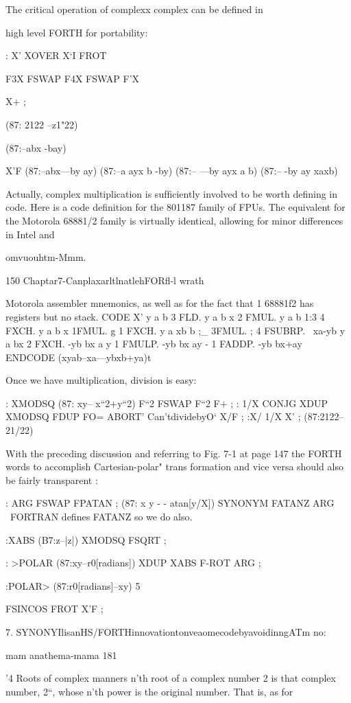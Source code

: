 {The critical operation of complexx complex can be deﬁned in

high level FORTH for portability:

: X'
XOVER X‘I FROT

F3X FSWAP
F4X FSWAP
F'X

X+ ;

(87: 2122 --z1"22)

(87:--abx -bay)

X'F (87:--abx—by ay)
(87:--a ayx b -by)
(87:-- —by ayx a b)
(87:-- -by ay xaxb)

Actually, complex multiplication is sufﬁciently involved to be
worth deﬁning in code. Here is a code deﬁnition for the 801187
family of FPUs. The equivalent for the Motorola 68881/2 family
is virtually identical, allowing for minor differences in Intel and

omvuouhtm-Mmm.

150 Chaptar7-CanplaxarltlnatlehFORﬂ-l wrath

 

Motorola assembler mnemonics, as well as for the fact that 1%
68881f2 has registers but no stack.
\oneration 31mm
CODE X' \x y a b
3 FLD. \x y a b x
2 FMUL. \x y a b 1:3
4 FXCH. \xa y a b x
1FMUL. \xayabxb g
1 FXCH. \xa y a xb b ;_
3FMUL. \xayabxyb ;
4 FSUBRP. \ xa-yb y a bx
2 FXCH. \xa-yb bx a y
1 FMULP. \xa-yb bx ay -
1 FADDP. \xa-yb bx+ay
ENDCODE (xyab--xa—ybxb+ya)t

Once we have multiplication, division is easy:

: XMODSQ (87: xy-- x“2+y“2)
F“2 FSWAP F“2 F+ ;
: 1/X CONJG XDUP XMODSQ
FDUP FO= ABORT' Can'tdividebyO‘ X/F ;
:X/ 1/X X’ ; (87:2122--21/22)

With the preceding discussion and referring to Fig. 7-1 at
page 147 the FORTH words to accomplish Cartesian-polar" trans
formation and vice versa should also be fairly transparent :

: ARG FSWAP FPATAN ; (87: x y - - atan[y/X])
SYNONYM FATANZ ARG
\ FORTRAN defines FATANZ so we do also.

:XABS (B7:z--|z|)
XMODSQ FSQRT ;

: >POLAR (87:xy--r0[radians])
XDUP XABS F-ROT ARG ;

:POLAR> (87:r0[radians]--xy) 5

FSINCOS FROT X'F ;

7. SYNONYIlisanHS/FORTHinnovationtonveaomecodebyavoidinngATm no:

mam anathema-mama 181

'4 Roots of complex manners
n'th root of a complex number 2 is that complex number,
2“, whose n'th power is the original number. That is, as for

}
